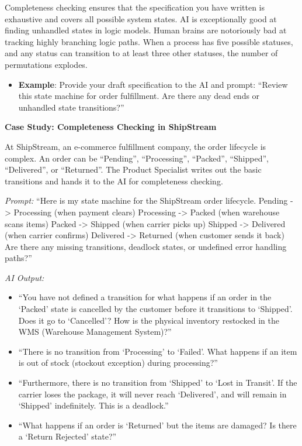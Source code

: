 \documentclass[
  11pt,
  openany,
  oneside]{book}
\providecommand{\tightlist}{%
  \setlength{\itemsep}{0pt}\setlength{\parskip}{0pt}}
\begin{document}
Completeness checking ensures that the specification you have written is
exhaustive and covers all possible system states. AI is exceptionally
good at finding unhandled states in logic models. Human brains are
notoriously bad at tracking highly branching logic paths. When a process
has five possible statuses, and any status can transition to at least
three other statuses, the number of permutations explodes.

\begin{itemize}
\tightlist
\item
  \textbf{Example}: Provide your draft specification to the AI and
  prompt: ``Review this state machine for order fulfillment. Are there
  any dead ends or unhandled state transitions?''
\end{itemize}

\textbf{Case Study: Completeness Checking in ShipStream}

At ShipStream, an e-commerce fulfillment company, the order lifecycle is
complex. An order can be ``Pending'', ``Processing'', ``Packed'',
``Shipped'', ``Delivered'', or ``Returned''. The Product Specialist
writes out the basic transitions and hands it to the AI for completeness
checking.

\emph{Prompt:} ``Here is my state machine for the ShipStream order
lifecycle. Pending -\textgreater{} Processing (when payment clears)
Processing -\textgreater{} Packed (when warehouse scans items) Packed
-\textgreater{} Shipped (when carrier picks up) Shipped -\textgreater{}
Delivered (when carrier confirms) Delivered -\textgreater{} Returned
(when customer sends it back) Are there any missing transitions,
deadlock states, or undefined error handling paths?''

\emph{AI Output:}

\begin{itemize}
\tightlist
\item
  ``You have not defined a transition for what happens if an order in
  the `Packed' state is cancelled by the customer before it transitions
  to `Shipped'. Does it go to `Cancelled'? How is the physical inventory
  restocked in the WMS (Warehouse Management System)?''
\item
  ``There is no transition from `Processing' to `Failed'. What happens
  if an item is out of stock (stockout exception) during processing?''
\item
  ``Furthermore, there is no transition from `Shipped' to `Lost in
  Transit'. If the carrier loses the package, it will never reach
  `Delivered', and will remain in `Shipped' indefinitely. This is a
  deadlock.''
\item
  ``What happens if an order is `Returned' but the items are damaged? Is
  there a `Return Rejected' state?''
\end{itemize}
\end{document}
